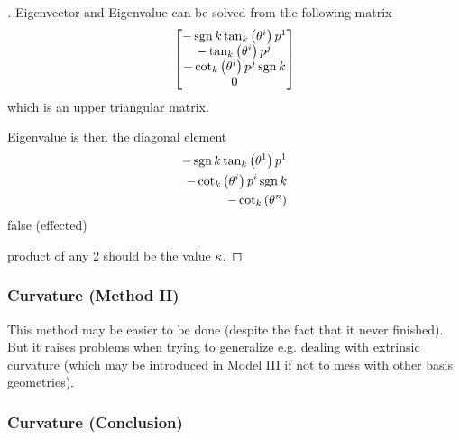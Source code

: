 \documentclass[stu, babel, american, biblatex, a4paper, draftall]{apa7}
\begin{document}
\begin{proof}[]
    \skipped

    Eigenvector and Eigenvalue can be solved from the following matrix
    \begin{align*}
        \begin{bmatrix}
            -\sign{k}\tan_k\left(\tensor{\theta}{^i}\right)\tensor{p}{^1}       \\
            -\tan_k\left(\tensor{\theta}{^i}\right)\tensor{p}{^j} \\
            -\cot_k\left(\tensor{\theta}{^i}\right)\tensor{p}{^j}\sign{k}\\
            0 \\
        \end{bmatrix}
    \end{align*}
    which is an upper triangular matrix.

    Eigenvalue is then the diagonal element
    \begin{align*}
        -\sign{k}\tan_k\left(\tensor{\theta}{^1}\right)\tensor{p}{^1} \\
        -\cot_k\left(\tensor{\theta}{^i}\right)\tensor{p}{^i}\sign{k} \\
        -\cot_k\left(\tensor{\theta}{^n}\right)
    \end{align*}
    false (effected)

    product of any 2 should be the value $\kappa$.
\end{proof}
\subsubsection{Curvature (Method II)}
This method may be easier to be done
(despite the fact that it never finished).
But it raises problems when trying to generalize e.g. dealing with extrinsic curvature
(which may be introduced in Model III
if not to mess with other basis geometries).
\begin{lemma}\label{Model:ChristoffelSymbol}

\end{lemma}
\begin{lemma}\label{Model:RiemannCurvatureTensor}

\end{lemma}
\subsubsection{Curvature (Conclusion)}
\begin{lemma}\label{Model:SectionalCurvature}

\end{lemma}
\end{document}
